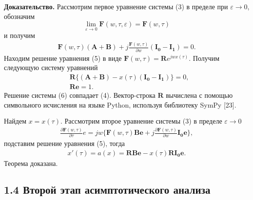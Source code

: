 \textbf{Доказательство.}  Рассмотрим первое уравнение системы (3) в пределе при $\varepsilon\rightarrow 0$, обозначим $$\lim_{\varepsilon\to 0} \boldsymbol{F}(w,\tau,\varepsilon)=\boldsymbol{F}(w,\tau)$$  и получим
\begin{align}
	\boldsymbol{F}(w,\tau)(\boldsymbol{A}+\boldsymbol{B})+j\frac{\boldsymbol{F}(w,\tau)}{\partial w}(\boldsymbol{I_{0}}-\boldsymbol{I_{1}})=0.
\end{align}
Находим решение уравнения (5) в виде $\boldsymbol{F}(w,\tau)=\boldsymbol{R}e^{jwx(\tau)}$. Получим следующую систему уравнений\\
\begin{equation}
	\begin{split}
		&\boldsymbol{R}\{(\boldsymbol{A}+\boldsymbol{B})-x(\tau)(\boldsymbol{I_{0}}-\boldsymbol{I_{1}})\}=0,\\
		&\boldsymbol{R}\boldsymbol{e}=1.
	\end{split}
\end{equation}
Решение системы (6) совпадает (4).
Вектор-строка $\boldsymbol{R}$ вычислена с помощью символьного исчисления на языке Python, используя библиотеку SymPy [23].

Найдем $x=x(\tau)$. Рассмотрим второе уравнение системы (3) в пределе $\varepsilon \rightarrow 0$
\begin{align*}
	\frac{\partial\boldsymbol{F}(w,\tau)}{\partial\tau}e=jw\bigg\{\boldsymbol{F}(w,\tau)\boldsymbol{Be}+j\frac{\partial\boldsymbol{F}(w,\tau)}{\partial w}\boldsymbol{I_{0}e}\bigg\},
\end{align*} 
подставим решение уравнения (5), тогда
\begin{align}
	x'(\tau)=a(x)=\boldsymbol{RBe}-x(\tau)\boldsymbol{RI_{0}e}.
\end{align} 
Теорема доказана.

\newpage
\subsection{1.4 Второй этап асимптотического анализа}

